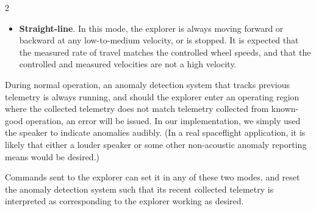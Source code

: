 \documentclass[10pt, fleqn]{article}
\newenvironment{Figure}
  {\par\medskip\noindent\minipage{\linewidth}}
  {\endminipage\par\medskip}
\begin{document}
\begin{multicols*}{2}
\begin{itemize}
  \item {\bf Straight-line}.  In this mode,
the explorer is always moving forward or backward at
any low-to-medium velocity, or is stopped.
It is expected that the measured rate of travel
matches the controlled wheel speeds,
and that the controlled and measured velocities
are not a high velocity.
\end{itemize}

During normal operation,
an anomaly detection system that tracks previous telemetry
is always running,
and should the explorer enter an operating region where the
collected telemetry does not match
telemetry collected from known-good operation,
an error will be issued.
In our implementation,
we simply used the speaker to indicate anomalies audibly.
(In a real spaceflight application,
it is likely that either a louder speaker or
some other non-acoustic anomaly reporting means would be desired.)

Commands sent to the explorer
can set it in any of these two modes,
and reset the anomaly detection system
such that its recent collected telemetry
is interpreted as corresponding to the explorer working as desired.

\begin{Figure}
    \centering
\end{Figure}
\end{multicols*}
\end{document}

